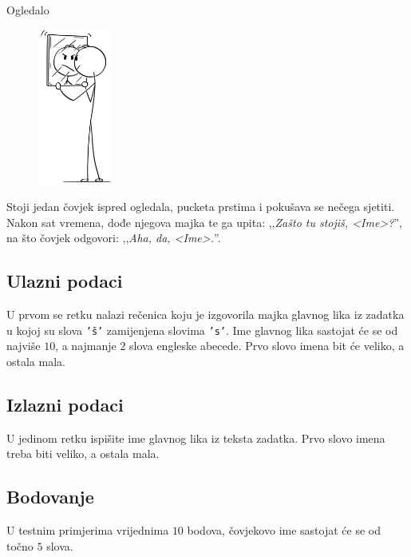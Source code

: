 \begin{statement}[
  problempoints=20,
  timelimit=1 sekunda,
  memorylimit=512 MiB,
]{Ogledalo}

\setlength\intextsep{-0.1cm}
\begin{figure}
\centering
\includegraphics[width=0.22\textwidth]{img/ogledalo.png}
\end{figure}

Stoji jedan čovjek ispred ogledala, pucketa prstima i pokušava se nečega
sjetiti. Nakon sat vremena, dođe njegova majka te ga upita: ,,\textit{Zašto
tu stojiš, <Ime>?}'', na što čovjek odgovori: ,,\textit{Aha, da, <Ime>.}''.

\subsection*{Ulazni podaci}
U prvom se retku nalazi rečenica koju je izgovorila majka glavnog lika iz
zadatka u kojoj su slova \texttt{'š'} zamijenjena slovima \texttt{'s'}. Ime
glavnog lika sastojat će se od najviše $10$, a najmanje $2$ slova engleske
abecede. Prvo slovo imena bit će veliko, a ostala mala.

\subsection*{Izlazni podaci}
U jedinom retku ispišite ime glavnog lika iz teksta zadatka. Prvo slovo imena
treba biti veliko, a ostala mala.

\subsection*{Bodovanje}
U testnim primjerima vrijednima $10$ bodova, čovjekovo ime sastojat će se od
točno $5$ slova.\\


\end{statement}
